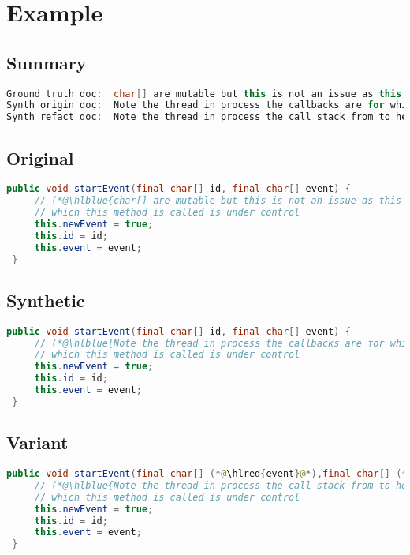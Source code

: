 \documentclass[11pt]{article}
\DeclareRobustCommand{\hlred}[1]{{\sethlcolor{YellowOrange}\hl{#1}}}
\DeclareRobustCommand{\hlblue}[1]{{\sethlcolor{SeaGreen}\hl{#1}}}
\DeclareRobustCommand{\hlblue}[1]{{\sethlcolor{SkyBlue}\hl{#1}}}
\begin{document}
\pagebreak
\section{Example}
\subsection{Summary}

\begin{lstlisting}[language=java]
Ground truth doc:  char[] are mutable but this is not an issue as this class is package-protected and the code from
Synth origin doc:  Note the thread in process the callbacks are for which event listeners and thus that it identifies a
Synth refact doc:  Note the thread in process the call stack from to here and which frame is being tracked are which
\end{lstlisting}

\subsection{Original}
\begin{lstlisting}[language=java]
 public void startEvent(final char[] id, final char[] event) {
     // (*@\hlblue{char[] are mutable but this is not an issue as this class is package-protected and the code from}@*)
     // which this method is called is under control
     this.newEvent = true;
     this.id = id;
     this.event = event;
 }
\end{lstlisting}

\subsection{Synthetic}

\begin{lstlisting}[language=java]
 public void startEvent(final char[] id, final char[] event) {
     // (*@\hlblue{Note the thread in process the callbacks are for which event listeners and thus that it identifies a}@*)
     // which this method is called is under control
     this.newEvent = true;
     this.id = id;
     this.event = event;
 }
\end{lstlisting}

\subsection{Variant}

\begin{lstlisting}[language=java]
 public void startEvent(final char[] (*@\hlred{event}@*),final char[] (*@\hlred{id}@*)) {
     // (*@\hlblue{Note the thread in process the call stack from to here and which frame is being tracked are which}@*)
     // which this method is called is under control
     this.newEvent = true;
     this.id = id;
     this.event = event;
 }
\end{lstlisting}
\end{document}
